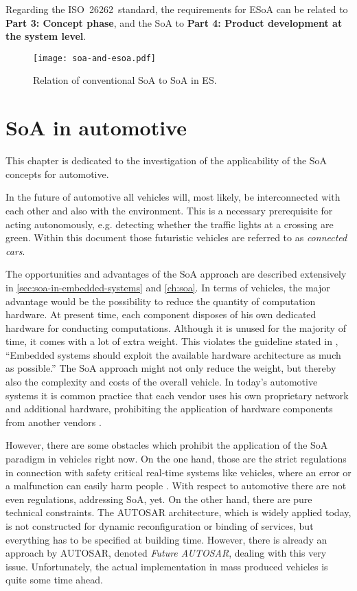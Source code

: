 Regarding the \mbox{ISO 26262 standard}, the requirements for ESoA can be related to \textbf{Part 3: Concept phase}, and the SoA to \textbf{Part 4: Product development at the system level}.


\begin{figure}[!htbp]
\centering
\texttt{[image: soa-and-esoa.pdf]}
\caption{Relation of conventional SoA to SoA in ES.}
\label{fig:soa-and-esoa}
\end{figure}







\section{SoA in automotive}
\label{sec:soa-in-automotive}

This chapter is dedicated to the investigation of the applicability of the SoA concepts for automotive.

In the future of automotive all vehicles will, most likely, be interconnected with each other and also with the environment. This is a necessary prerequisite for acting autonomously, e.g. detecting whether the traffic lights at a crossing are green. Within this document those futuristic vehicles are referred to as \emph{connected cars}.

The opportunities and advantages of the SoA approach are described extensively in \ref{sec:soa-in-embedded-systems} and \ref{ch:soa}. In terms of vehicles, the major advantage would be the possibility to reduce the quantity of computation hardware. At present time, each component disposes of his own dedicated hardware for conducting computations. Although it is unused for the majority of time, it comes with a lot of extra weight. This violates the guideline stated in \cite[p.7]{marwedel}, ``Embedded systems should exploit the available hardware architecture as much as possible.'' The SoA approach might not only reduce the weight, but thereby also the complexity and costs of the overall vehicle. In today's automotive systems it is common practice that each vendor uses his own proprietary network and additional hardware, prohibiting the application of hardware components from another vendors \cite{sommer}.

However, there are some obstacles which prohibit the application of the SoA paradigm in vehicles right now. On the one hand, those are the strict regulations in connection with safety critical real-time systems like vehicles, where an error or a malfunction can easily harm people \cite{kum}. With respect to automotive there are not even regulations, addressing SoA, yet. On the other hand, there are pure technical constraints. The \mbox{AUTOSAR} architecture, which is widely applied today, is not constructed for dynamic reconfiguration or binding of services, but everything has to be specified at building time. However, there is already an approach by \mbox{AUTOSAR}, denoted \emph{Future \mbox{AUTOSAR}}, dealing with this very issue. Unfortunately, the actual implementation in mass produced vehicles is quite some time ahead.

